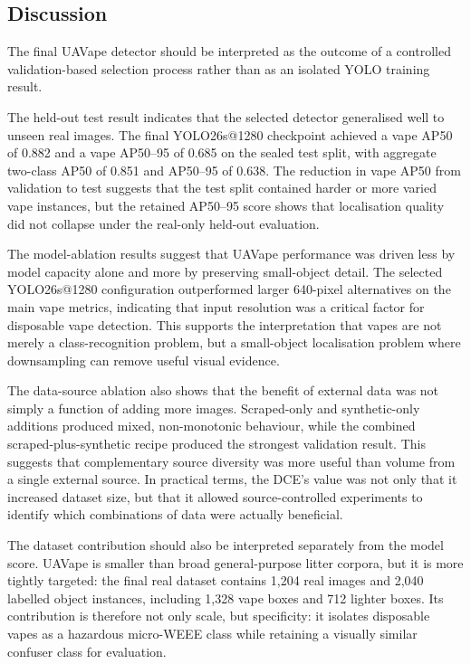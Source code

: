 \subsection{Discussion}

The final UAVape detector should be interpreted as the outcome of a controlled validation-based selection process rather than as an isolated YOLO training result.

The held-out test result indicates that the selected detector generalised well to unseen real images. The final YOLO26s@1280 checkpoint achieved a vape AP50 of 0.882 and a vape AP50--95 of 0.685 on the sealed test split, with aggregate two-class AP50 of 0.851 and AP50--95 of 0.638. The reduction in vape AP50 from validation to test suggests that the test split contained harder or more varied vape instances, but the retained AP50--95 score shows that localisation quality did not collapse under the real-only held-out evaluation.

The model-ablation results suggest that UAVape performance was driven less by model capacity alone and more by preserving small-object detail. The selected YOLO26s@1280 configuration outperformed larger 640-pixel alternatives on the main vape metrics, indicating that input resolution was a critical factor for disposable vape detection. This supports the interpretation that vapes are not merely a class-recognition problem, but a small-object localisation problem where downsampling can remove useful visual evidence.

The data-source ablation also shows that the benefit of external data was not simply a function of adding more images. Scraped-only and synthetic-only additions produced mixed, non-monotonic behaviour, while the combined scraped-plus-synthetic recipe produced the strongest validation result. This suggests that complementary source diversity was more useful than volume from a single external source. In practical terms, the DCE's value was not only that it increased dataset size, but that it allowed source-controlled experiments to identify which combinations of data were actually beneficial.

The dataset contribution should also be interpreted separately from the model score. UAVape is smaller than broad general-purpose litter corpora, but it is more tightly targeted: the final real dataset contains 1,204 real images and 2,040 labelled object instances, including 1,328 vape boxes and 712 lighter boxes. Its contribution is therefore not only scale, but specificity: it isolates disposable vapes as a hazardous micro-WEEE class while retaining a visually similar confuser class for evaluation.

